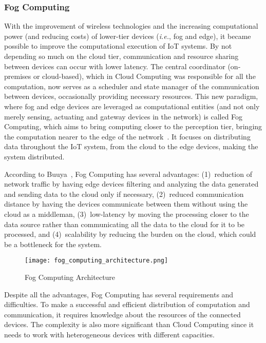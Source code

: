 \subsubsection{Fog Computing}\label{sec:fog_computing}

With the improvement of wireless technologies and the increasing computational power (and reducing costs) of lower-tier devices (\emph{i.e.}, fog and edge), it became possible to improve the computational execution of IoT systems. By not depending so much on the cloud tier, communication and resource sharing between devices can occur with lower latency. The central coordinator (on-premises or cloud-based), which in Cloud Computing was responsible for all the computation, now serves as a scheduler and state manager of the communication between devices, occasionally providing necessary resources. This new paradigm, where fog and edge devices are leveraged as computational entities (and not only merely sensing, actuating and gateway devices in the network) is called Fog Computing, which aims to bring computing closer to the perception tier, bringing the computation nearer to the edge of the network~\cite{mobile_cloud}. It focuses on distributing data throughout the IoT system, from the cloud to the edge devices, making the system distributed.

According to Buuya~\cite{IoT_principles_and_paradigms}, Fog Computing has several advantages: (1)~reduction of network traffic by having edge devices filtering and analyzing the data generated and sending data to the cloud only if necessary, (2)~reduced communication distance by having the devices communicate between them without using the cloud as a middleman, (3)~low-latency by moving the processing closer to the data source rather than communicating all the data to the cloud for it to be processed, and (4)~scalability by reducing the burden on the cloud, which could be a bottleneck for the system.

\begin{figure}[h]
\centering
\texttt{[image: fog\_computing\_architecture.png]}
\caption[Fog Computing Architecture]{Fog Computing Architecture~\cite{IoT_principles_and_paradigms}}
\label{fig:fog_architecture}
\end{figure}

Despite all the advantages, Fog Computing has several requirements and difficulties. To make a successful and efficient distribution of computation and communication, it requires knowledge about the resources of the connected devices. The complexity is also more significant than Cloud Computing since it needs to work with heterogeneous devices with different capacities.
       
